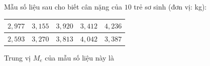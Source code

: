 \begin{ex}
Mẫu số liệu sau cho biết cân nặng của $10$ trẻ sơ sinh (đơn vị: kg):
\begin{center}
\begin{tabular}{|c|c|c|c|c|}\hline
$2{,}977$ & $3{,}155$ & $3{,}920$ & $3{,}412$ & $4{,}236$\\\hline
$2{,}593$ & $3{,}270$ & $3{,}813$ & $4{,}042$ & $3{,}387$\\\hline
\end{tabular}
\end{center}
Trung vị $M_e$ của mẫu số liệu này là
\end{ex}
